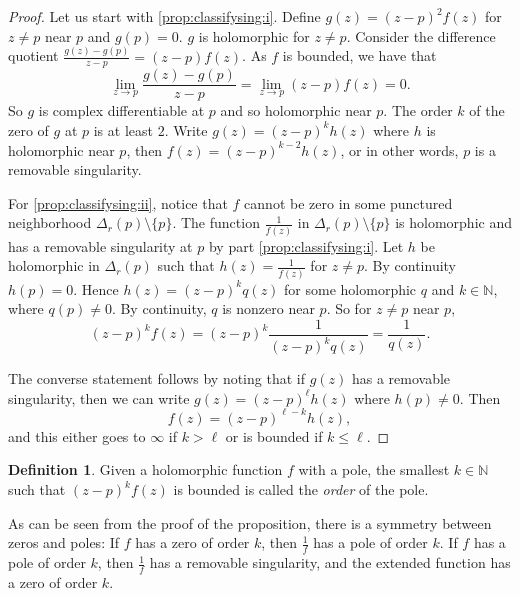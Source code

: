 \documentclass[12pt,openany]{book}
\newcommand{\N}{{\mathbb{N}}}
\theoremstyle{plain}
\theoremstyle{remark}
\theoremstyle{definition}
\newtheorem{defn}[thm]{Definition}
\theoremstyle{exercise}
\theoremstyle{example}
\begin{document}
\begin{proof}
Let us start with
\ref{prop:classifysing:i}.
Define
$g(z) = {(z-p)}^2 f(z)$ for $z \not= p$ near $p$ and $g(p) = 0$.
$g$ is holomorphic for $z \not= p$.  Consider the 
difference quotient
$\frac{g(z)-g(p)}{z-p} = (z-p) f(z)$.
As $f$ is bounded, we have that
\begin{equation*}
\lim_{z\to p} \frac{g(z)-g(p)}{z-p} = \lim_{z\to p} (z-p) f(z) = 0 .
\end{equation*}
So $g$ is complex differentiable at $p$ and so holomorphic near $p$.
The order $k$ of the zero of $g$ at $p$ is at least $2$.  Write
$g(z) = {(z-p)}^k h(z)$ where $h$ is holomorphic near $p$,
then $f(z) = {(z-p)}^{k-2}h(z)$, or in other words, $p$ is a removable 
singularity.

For
\ref{prop:classifysing:ii}, notice that $f$ cannot be zero in some
punctured neighborhood $\Delta_r(p) \setminus \{p\}$.  The function
$\frac{1}{f(z)}$ in $\Delta_r(p) \setminus \{p\}$ is holomorphic
and has a removable singularity at $p$ by part
\ref{prop:classifysing:i}.  Let $h$ be holomorphic in $\Delta_r(p)$
such that $h(z) = \frac{1}{f(z)}$ for $z \not= p$.  By continuity $h(p) =
0$.  Hence $h(z) = {(z-p)}^k q(z)$ for some holomorphic $q$ and $k \in \N$,
where $q(p) \not= 0$.  By continuity, $q$ is nonzero near $p$.
So for $z \not= p$ near $p$,
\begin{equation*}
{(z-p)}^k f(z)
=
{(z-p)}^k \frac{1}{{(z-p)}^k q(z)}
=
\frac{1}{q(z)} .
\end{equation*}

The converse statement follows by noting that if $g(z)$ has a removable
singularity, then we can write $g(z) = {(z-p)}^\ell h(z)$ where $h(p) \not= 0$.
Then
\begin{equation*}
f(z) = {(z-p)}^{\ell-k} h(z) ,
\end{equation*}
and this either goes to $\infty$ if $k > \ell$ or is bounded if $k \leq
\ell$.
\end{proof}

\begin{defn}
Given a holomorphic function $f$ with a pole, the smallest $k \in \N$
such that ${(z-p)}^k f(z)$ is bounded is called the
\emph{order} of the pole.
\end{defn}

As can be seen from the proof of the proposition,
there is a symmetry between zeros and poles:
If $f$ has a zero of order $k$, then $\frac{1}{f}$ has a pole of order $k$.
If $f$ has a pole of order $k$, then $\frac{1}{f}$
has a removable singularity, and the extended function has a zero of order
$k$.
\end{document}
